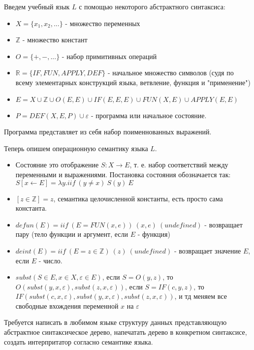 Введем учебный язык $L$ с помощью некоторого абстрактного синтаксиса:

\begin{itemize}
\item $X = \{x_1, x_2, ... \}$ - множество переменных

\item $\mathbb{Z}$ - множество констант

\item $O=\{+,-,...\}$ - набор примитивных операций

\item $\mathbb{R} = \{IF, FUN, APPLY, DEF\}$ - начальное множество символов (судя по всему элементарных конструкций языка, ветвление, функция и "применение")

\item $E = X\cup\mathbb{Z}\cup O\left(E,E\right)\cup IF\left(E,E,E\right)\cup FUN\left(X,E\right)\cup APPLY\left(E,E\right)$

\item $P = DEF\left(X,E,P\right)\cup\varepsilon$ - программа или начальное состояние.
\end{itemize}

Программа представляет из себя набор поименнованных выражений.

Теперь опишем операционную семантику языка $L$.

\begin{itemize}
\item Состояние это отображение $S : X \rightarrow E$, т. е. набор соответствий между переменными и выражениями. Постановка состояния обозначается так:
$S\left[x \leftarrow E\right] = \lambda y . iif~\left(y\not=x\right)~S\left(y\right)~E$

\item $\left[z \in \mathbb{Z}\right] = z$, семантика целочисленной константы, есть просто сама константа.

\item $defun\left(E\right) = iif~\left(E=FUN\left(x,e\right)\right)~\left(x,e\right)~\left(undefined\right)$ - возвращает пару (тело функции и аргумент, если $E$ - функция)

\item $deint\left(E\right) = iif~\left(E=z\in\mathbb{Z}\right)~\left(z\right)~\left(undefined\right)$ - возвращает значение $E$, если $E$ - число.

\item $subst\left(S\in E, x\in X, \varepsilon\in E\right)$, если $S = O\left(y,z\right)$, то $O\left(subst\left(y,x,\varepsilon\right),subst\left(z,x,\varepsilon\right)\right)$,
если $S=IF\left(c,y,z\right)$, то $IF\left(subst\left(c,x,\varepsilon\right),subst\left(y,x,\varepsilon\right),subst\left(z,x,\varepsilon\right)\right)$, и тд меняем все
свободные вхождения переменной $x$ на $\varepsilon$
\end{itemize}

Требуется написать в любимом языке структуру данных представляющую абстрактное синтаксическое дерево, напечатать дерево в конкретном синтаксисе, создать
интерпритатор согласно семантике языка.